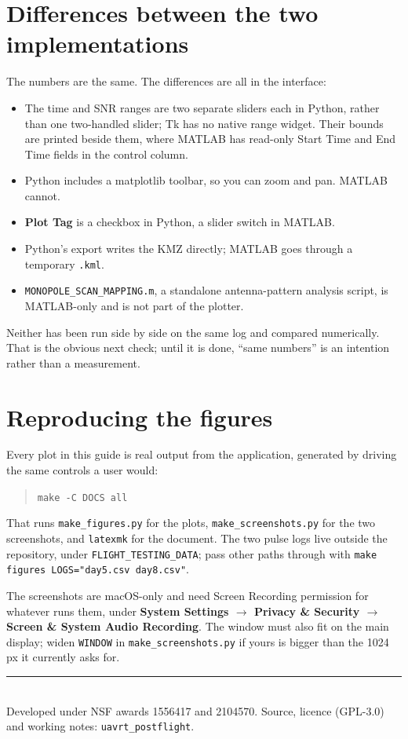 \documentclass[11pt,a4paper]{article}
\newcommand{\code}[1]{\texttt{\small #1}}
\begin{document}
\appendix
\section{Differences between the two implementations}

The numbers are the same. The differences are all in the interface:

\begin{itemize}
\item The time and SNR ranges are two separate sliders each in Python, rather
      than one two-handled slider; Tk has no native range widget. Their bounds
      are printed beside them, where MATLAB has read-only Start Time and End
      Time fields in the control column.
\item Python includes a matplotlib toolbar, so you can zoom and pan. MATLAB
      cannot.
\item \textbf{Plot Tag} is a checkbox in Python, a slider switch in MATLAB.
\item Python's export writes the KMZ directly; MATLAB goes through a temporary
      \code{.kml}.
\item \code{MONOPOLE\_SCAN\_MAPPING.m}, a standalone antenna-pattern analysis
      script, is MATLAB-only and is not part of the plotter.
\end{itemize}

\noindent Neither has been run side by side on the same log and compared
numerically. That is the obvious next check; until it is done, ``same numbers''
is an intention rather than a measurement.

\section{Reproducing the figures}

Every plot in this guide is real output from the application, generated by
driving the same controls a user would:

\begin{quote}\code{make -C DOCS all}\end{quote}

\noindent That runs \code{make\_figures.py} for the plots,
\code{make\_screenshots.py} for the two screenshots, and \code{latexmk} for the
document. The two pulse logs live outside the repository, under
\code{FLIGHT\_TESTING\_DATA}; pass other paths through with
\code{make figures LOGS="day5.csv day8.csv"}.

The screenshots are macOS-only and need Screen Recording permission for whatever
runs them, under \textbf{System Settings $\rightarrow$ Privacy \& Security
$\rightarrow$ Screen \& System Audio Recording}. The window must also fit on the
main display; widen \code{WINDOW} in \code{make\_screenshots.py} if yours is
bigger than the 1024\,px it currently asks for.

\vspace{0.6cm}
\noindent\textcolor{rulegrey}{\rule{\textwidth}{0.8pt}}\\[4pt]
{\small Developed under NSF awards 1556417 and 2104570. Source, licence (GPL-3.0)
and working notes: \code{uavrt\_postflight}.}
\end{document}
